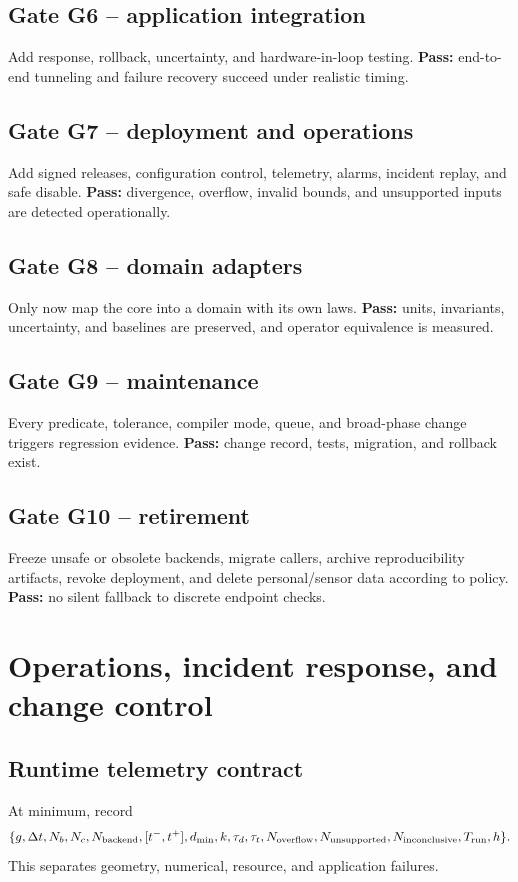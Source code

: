 \documentclass[11pt,a4paper,openany]{book}
\begin{document}
\section{Gate G6 -- application integration}
Add response, rollback, uncertainty, and hardware-in-loop testing. \textbf{Pass:} end-to-end tunneling and failure recovery succeed under realistic timing.

\section{Gate G7 -- deployment and operations}
Add signed releases, configuration control, telemetry, alarms, incident replay, and safe disable. \textbf{Pass:} divergence, overflow, invalid bounds, and unsupported inputs are detected operationally.

\section{Gate G8 -- domain adapters}
Only now map the core into a domain with its own laws. \textbf{Pass:} units, invariants, uncertainty, and baselines are preserved, and operator equivalence is measured.

\section{Gate G9 -- maintenance}
Every predicate, tolerance, compiler mode, queue, and broad-phase change triggers regression evidence. \textbf{Pass:} change record, tests, migration, and rollback exist.

\section{Gate G10 -- retirement}
Freeze unsafe or obsolete backends, migrate callers, archive reproducibility artifacts, revoke deployment, and delete personal/sensor data according to policy. \textbf{Pass:} no silent fallback to discrete endpoint checks.

\chapter{Operations, incident response, and change control}
\section{Runtime telemetry contract}
At minimum, record
\begin{equation}
\{g,\Delta t,N_b,N_c,N_{\rm backend},[t^-,t^+],d_{\min},k,\tau_d,\tau_t,
N_{\rm overflow},N_{\rm unsupported},N_{\rm inconclusive},T_{\rm run},h\}.
\end{equation}
This separates geometry, numerical, resource, and application failures.
\end{document}
